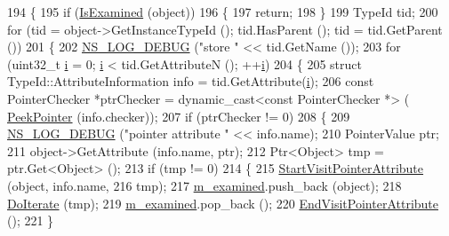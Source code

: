 \begin{DoxyCode}
194 \{
195   \textcolor{keywordflow}{if} (\hyperlink{classns3_1_1AttributeIterator_a2875dc7947e54711f8529f59ee9e510e}{IsExamined} (\textcolor{keywordtype}{object}))
196     \{
197       \textcolor{keywordflow}{return};
198     \}
199   TypeId tid;
200   \textcolor{keywordflow}{for} (tid = object->GetInstanceTypeId (); tid.HasParent (); tid = tid.GetParent ())
201     \{
202       \hyperlink{group__logging_ga413f1886406d49f59a6a0a89b77b4d0a}{NS\_LOG\_DEBUG} (\textcolor{stringliteral}{"store "} << tid.GetName ());
203       \textcolor{keywordflow}{for} (uint32\_t \hyperlink{bernuolliDistribution_8m_a6f6ccfcf58b31cb6412107d9d5281426}{i} = 0; \hyperlink{bernuolliDistribution_8m_a6f6ccfcf58b31cb6412107d9d5281426}{i} < tid.GetAttributeN (); ++\hyperlink{bernuolliDistribution_8m_a6f6ccfcf58b31cb6412107d9d5281426}{i})
204         \{
205           \textcolor{keyword}{struct }TypeId::AttributeInformation info = tid.GetAttribute(\hyperlink{bernuolliDistribution_8m_a6f6ccfcf58b31cb6412107d9d5281426}{i});
206           \textcolor{keyword}{const} PointerChecker *ptrChecker = \textcolor{keyword}{dynamic\_cast<}\textcolor{keyword}{const }PointerChecker *\textcolor{keyword}{>} (
      \hyperlink{namespacens3_af2a7557fe9afdd98d8f6f8f6e412cf5a}{PeekPointer} (info.checker));
207           \textcolor{keywordflow}{if} (ptrChecker != 0)
208             \{
209               \hyperlink{group__logging_ga413f1886406d49f59a6a0a89b77b4d0a}{NS\_LOG\_DEBUG} (\textcolor{stringliteral}{"pointer attribute "} << info.name);
210               PointerValue ptr;
211               \textcolor{keywordtype}{object}->GetAttribute (info.name, ptr);
212               Ptr<Object> tmp = ptr.Get<Object> ();
213               \textcolor{keywordflow}{if} (tmp != 0)
214                 \{
215                   \hyperlink{classns3_1_1AttributeIterator_ae64fc62245f72c257ef7d5b8e1f8caea}{StartVisitPointerAttribute} (\textcolor{keywordtype}{object}, info.name,
216                                               tmp);
217                   \hyperlink{classns3_1_1AttributeIterator_ab43bac2d9c3ddcc7aa92ab5b727741dc}{m\_examined}.push\_back (\textcolor{keywordtype}{object});
218                   \hyperlink{classns3_1_1AttributeIterator_a01259d50f232e21c9c605547e26b34bb}{DoIterate} (tmp);
219                   \hyperlink{classns3_1_1AttributeIterator_ab43bac2d9c3ddcc7aa92ab5b727741dc}{m\_examined}.pop\_back ();
220                   \hyperlink{classns3_1_1AttributeIterator_af9ce0540929ea6defa9bb675814760f4}{EndVisitPointerAttribute} ();
221                 \}

\end{DoxyCode}
